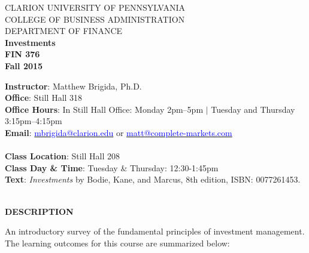 \documentclass{article}
\begin{document}
\begin{center}
CLARION UNIVERSITY OF PENNSYLVANIA\\
COLLEGE OF BUSINESS ADMINISTRATION\\
DEPARTMENT OF FINANCE
\\
{\bf Investments}\\
{\bf FIN 376}\\
{\bf Fall 2015}\\
\end{center}
\vspace*{5pt}
{\bf Instructor}: Matthew Brigida, Ph.D. \\
{\bf Office}: Still Hall 318\\
{\bf Office Hours}:  In Still Hall Office:  Monday 2pm--5pm $|$ Tuesday and Thursday 3:15pm--4:15pm\\
{\bf Email}: 
\href{mailto:mbrigida@clarion.edu}{\textcolor{blue}{mbrigida@clarion.edu}} or \href{mailto:matt@complete-markets.com}{\textcolor{blue}{matt@complete-markets.com}} \\
\\
{\bf Class Location}:  Still Hall 208\\
{\bf Class Day \& Time}: Tuesday \& Thursday: 12:30-1:45pm
\\
{\bf Text}: {\it Investments} by Bodie, Kane, and Marcus, 8th edition, ISBN: 0077261453.
\\
\\
\begin{center}
{\bf DESCRIPTION}
\end{center}  
An introductory survey of the fundamental principles of investment management.
The learning outcomes for this course are summarized below:
\end{document}

